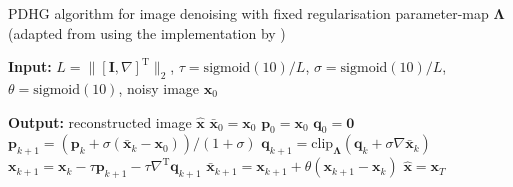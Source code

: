 

\begin{algorithm}[H]
    \caption{PDHG algorithm for image denoising with fixed regularisation parameter-map $\boldsymbol{\Lambda}$ (adapted from \cite{kofler2023learning} using the implementation by \cite{dyn_img_pdhg_code})}
    \begin{algorithmic}[1]
    
    \STATE \textbf{Input:} 
    $L = \| [\mathbf{I}, \nabla]^\text{T} \|_2$, 
    $\tau = \text{sigmoid}(10) / L$, 
    $\sigma = \text{sigmoid}(10) / L$, 
    $\theta = \text{sigmoid}(10)$, 
    noisy image $\mathbf{x}_0$
    
    \STATE \textbf{Output:} reconstructed image $\hat{\mathbf{x}}$
    \STATE $\bar{\mathbf{x}}_0 = \mathbf{x}_0$
    \STATE $\mathbf{p}_0 = \mathbf{x}_0$
    \STATE $\mathbf{q}_0 = \mathbf{0}$
        \STATE $\mathbf{p}_{k+1} = \left(\mathbf{p}_k + \sigma ( \bar{\mathbf{x}}_k - \mathbf{x}_0)\right) / (1 + \sigma)$
        \STATE $\mathbf{q}_{k+1} = \text{clip}_{\boldsymbol{\Lambda}} \left(\mathbf{q}_k + \sigma \nabla \bar{\mathbf{x}}_k \right)$
        \STATE $\mathbf{x}_{k+1} = \mathbf{x}_k - \tau \mathbf{p}_{k+1} - \tau \nabla^\text{T} \mathbf{q}_{k+1}$
        \STATE $\bar{\mathbf{x}}_{k+1} = \mathbf{x}_{k+1} + \theta (\mathbf{x}_{k+1} - \mathbf{x}_k)$
    \ENDFOR
    \STATE $\hat{\mathbf{x}} = \mathbf{x}_T$
    \end{algorithmic}
    \end{algorithm}


